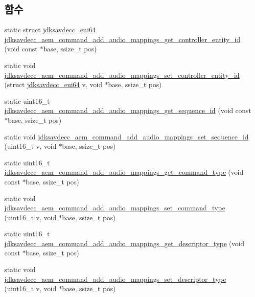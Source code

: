 \subsection*{함수}
\begin{DoxyCompactItemize}
\item 
static struct \hyperlink{structjdksavdecc__eui64}{jdksavdecc\+\_\+eui64} \hyperlink{group__command__add__audio__mappings_ga029eb87dc0f4454ed7d9a24f34b4a05d}{jdksavdecc\+\_\+aem\+\_\+command\+\_\+add\+\_\+audio\+\_\+mappings\+\_\+get\+\_\+controller\+\_\+entity\+\_\+id} (void const $\ast$base, ssize\+\_\+t pos)
\item 
static void \hyperlink{group__command__add__audio__mappings_ga2987d275915335bdc89dea0b131ff50b}{jdksavdecc\+\_\+aem\+\_\+command\+\_\+add\+\_\+audio\+\_\+mappings\+\_\+set\+\_\+controller\+\_\+entity\+\_\+id} (struct \hyperlink{structjdksavdecc__eui64}{jdksavdecc\+\_\+eui64} v, void $\ast$base, ssize\+\_\+t pos)
\item 
static uint16\+\_\+t \hyperlink{group__command__add__audio__mappings_gabb503ebea40569caad0e20e60442a3ee}{jdksavdecc\+\_\+aem\+\_\+command\+\_\+add\+\_\+audio\+\_\+mappings\+\_\+get\+\_\+sequence\+\_\+id} (void const $\ast$base, ssize\+\_\+t pos)
\item 
static void \hyperlink{group__command__add__audio__mappings_ga5c808dd171022236573da396057c0889}{jdksavdecc\+\_\+aem\+\_\+command\+\_\+add\+\_\+audio\+\_\+mappings\+\_\+set\+\_\+sequence\+\_\+id} (uint16\+\_\+t v, void $\ast$base, ssize\+\_\+t pos)
\item 
static uint16\+\_\+t \hyperlink{group__command__add__audio__mappings_gad8532e8c822a041a123fd3a8a58e8758}{jdksavdecc\+\_\+aem\+\_\+command\+\_\+add\+\_\+audio\+\_\+mappings\+\_\+get\+\_\+command\+\_\+type} (void const $\ast$base, ssize\+\_\+t pos)
\item 
static void \hyperlink{group__command__add__audio__mappings_gab125967d97b29ba1e016f8100a4ebc34}{jdksavdecc\+\_\+aem\+\_\+command\+\_\+add\+\_\+audio\+\_\+mappings\+\_\+set\+\_\+command\+\_\+type} (uint16\+\_\+t v, void $\ast$base, ssize\+\_\+t pos)
\item 
static uint16\+\_\+t \hyperlink{group__command__add__audio__mappings_gac0f768e0c023e0eeff445a968143ab93}{jdksavdecc\+\_\+aem\+\_\+command\+\_\+add\+\_\+audio\+\_\+mappings\+\_\+get\+\_\+descriptor\+\_\+type} (void const $\ast$base, ssize\+\_\+t pos)
\item 
static void \hyperlink{group__command__add__audio__mappings_gaeb2612b351fa37f00828eacbc44d875c}{jdksavdecc\+\_\+aem\+\_\+command\+\_\+add\+\_\+audio\+\_\+mappings\+\_\+set\+\_\+descriptor\+\_\+type} (uint16\+\_\+t v, void $\ast$base, ssize\+\_\+t pos)

\end{DoxyCompactItemize}
